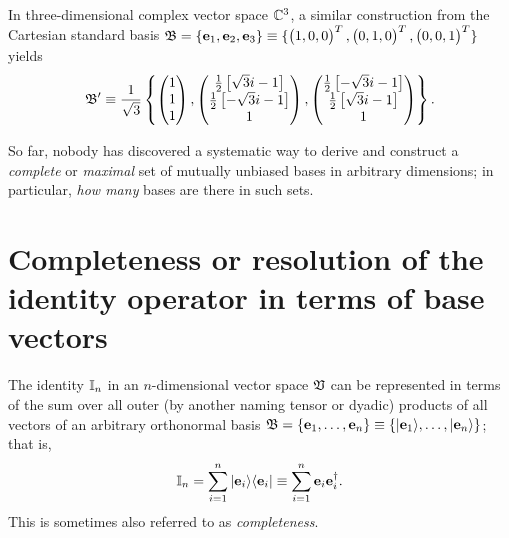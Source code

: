 {In three-dimensional complex vector space ${\Bbb C}^3$, a similar construction
from the Cartesian standard basis
${\frak B}=\{ {\bf e}_1 , {\bf e}_2, {\bf e}_3\} \equiv
\{\begin{pmatrix}1,0,0\end{pmatrix}^T,\begin{pmatrix}0,1,0\end{pmatrix}^T,\begin{pmatrix}0,0,1\end{pmatrix}^T\}$
yields
\begin{equation}
\begin{split}
 {\frak B}' \equiv   \frac{1}{\sqrt{3}}  \left\{
 \begin{pmatrix}1\\1\\1\end{pmatrix},
 \begin{pmatrix}\frac{1}{2} \left[{\sqrt{3}} i-1\right] \\ \frac{1}{2} \left[-{\sqrt{3}} i-1\right] \\
  1\end{pmatrix},
\begin{pmatrix}
 \frac{1}{ 2} \left[-{\sqrt{3}} i-1\right]\\ \frac{1}{ 2} \left[{\sqrt{3}} i-1\right]\\1  \end{pmatrix}
   \right\} .
\end{split}
\end{equation}
\eexample
}

So far, nobody  has discovered a systematic way to derive and construct a {\em complete} or {\em maximal}
set of mutually unbiased bases in arbitrary dimensions; in particular,
{\em how many} bases are there in such sets.


\section{Completeness or resolution of the identity operator in terms of base vectors}
\label{2016-m-ch-fdvsrotio}

The identity ${\Bbb I}_n$ in an $n$-dimensional vector space ${\frak V}$ can be represented in terms of the sum
over all outer (by another naming tensor or dyadic) products
of all vectors of an arbitrary orthonormal basis
${\frak B} =\{
{\bf e}_1,
\ldots ,
{\bf e}_n
\}
\equiv
\{
\vert {\bf e}_1 \rangle ,
\ldots ,
\vert{\bf e}_n \rangle
\}
$; that is,
\begin{equation}
 {\Bbb I}_n = \sum_{i=1}^n \vert {\bf e}_i \rangle \langle {\bf e}_i \vert
\equiv  \sum_{i=1}^n {\bf e}_i  {\bf e}_i^\dagger  .
\label{2016-m-ch-fdlws-roi}
\end{equation}
This is sometimes also referred to as {\em completeness}.

